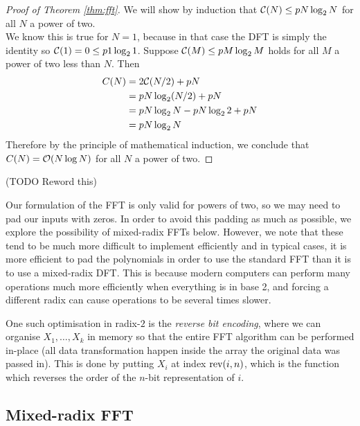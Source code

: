 \begin{proof}[Proof of Theorem \ref{thm:fft}]
    We will show by induction that $\mathcal C(N) \le pN\log_2 N$ for all $N$ a power of two.\\
    We know this is true for $N = 1$, because in that case the DFT is simply the identity so $\mathcal C(1) = 0 \le p1 \log_2 1$.
    Suppose $\mathcal C(M) \le pM\log_2 M$ holds for all $M$ a power of two less than $N$. Then
    \begin{align*}
        C(N)
        &= 2\mathcal C(N/2) + pN\\
        &= pN\log_2 (N/2) + pN\\
        &= pN\log_2 N - pN\log_2 2 + pN\\
        &= pN\log_2 N
    \end{align*}
    Therefore by the principle of mathematical induction, we conclude that $C(N) = \mathcal O(N \log N)$ for all $N$ a power of two.
\end{proof}

\begin{remark}
    (TODO Reword this)

    \medskip

    Our formulation of the FFT is only valid for powers of two, so we may need to pad our inputs with zeros. In order to avoid this padding as much as possible, we explore the possibility of mixed-radix FFTs below. However, we note that these tend to be much more difficult to implement efficiently and in typical cases, it is more efficient to pad the polynomials in order to use the standard FFT than it is to use a mixed-radix DFT. This is because modern computers can perform many operations much more efficiently when everything is in base 2, and forcing a different radix can cause operations to be several times slower.

    One such optimisation in radix-$2$ is the \emph{reverse bit encoding}, where we can organise $X_1, \ldots, X_k$ in memory so that the entire FFT algorithm can be performed in-place (all data transformation happen inside the array the original data was passed in). This is done by putting $X_i$ at index $\textrm{rev}(i, n)$, which is the function which reverses the order of the $n$-bit representation of $i$.
\end{remark}

\subsection{Mixed-radix FFT}

